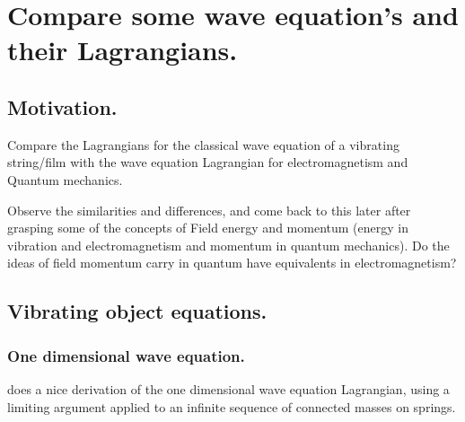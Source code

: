 
%
%


%

\chapter{Compare some wave equation's and their Lagrangians. }
\label{chap:waveLagrangian}
\date{ Dec 02, 2008.  waveLagrangian.tex }

%



\section{Motivation. }

Compare the Lagrangians for the classical wave equation of a vibrating string/film with the wave equation Lagrangian for electromagnetism and Quantum mechanics.

Observe the similarities and differences, and come back to this later after grasping some of the concepts of Field energy and momentum (energy in vibration and electromagnetism and momentum in quantum mechanics).  Do the ideas of field momentum carry in quantum have equivalents in electromagnetism?

\section{Vibrating object equations. }

\subsection{One dimensional wave equation. }

\citep{goldstein1951cm} does a nice derivation of the one dimensional wave
equation Lagrangian, using a limiting argument applied to an infinite
sequence of connected masses on springs.

